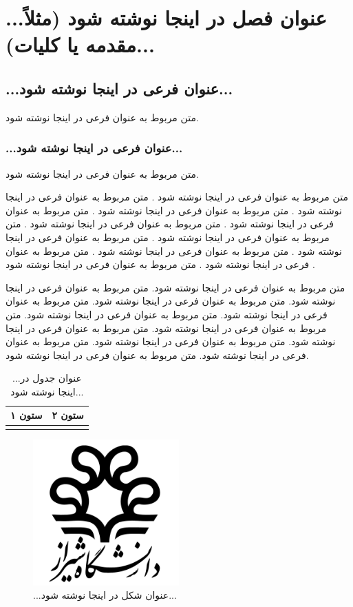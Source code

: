 \chapter{...عنوان فصل در اینجا نوشته شود (مثلاً مقدمه یا کلیات)...}

\section{...عنوان فرعی در اینجا نوشته شود...}
متن مربوط به عنوان فرعی در اینجا نوشته شود.

\subsection{...عنوان فرعی در اینجا نوشته شود...}
متن مربوط به عنوان فرعی در اینجا نوشته شود.

\newpage
متن مربوط به عنوان فرعی در اینجا نوشته شود \cite{sharif_1390}.
متن مربوط به عنوان فرعی در اینجا نوشته شود \cite{ghalamfarsa_1394}.
متن مربوط به عنوان فرعی در اینجا نوشته شود \cite{howitt_2008}.
متن مربوط به عنوان فرعی در اینجا نوشته شود \cite{ranzijn_2009}.
متن مربوط به عنوان فرعی در اینجا نوشته شود \cite{datnoff_2001}.
متن مربوط به عنوان فرعی در اینجا نوشته شود \cite{sas}.
متن مربوط به عنوان فرعی در اینجا نوشته شود \cite{rahimian_1392}.
متن مربوط به عنوان فرعی در اینجا نوشته شود \cite{alishahi_1393}.
متن مربوط به عنوان فرعی در اینجا نوشته شود \cite{andjic_2007,sohrabi_2011}.
متن مربوط به عنوان فرعی در اینجا نوشته شود \cite{game_2001,habibi_1394,ignatov_2013,bekker_2007,aps,wikipedia}.

\newpage
متن مربوط به عنوان فرعی در اینجا نوشته شود.
متن مربوط به عنوان فرعی در اینجا نوشته شود.
متن مربوط به عنوان فرعی در اینجا نوشته شود.
متن مربوط به عنوان فرعی در اینجا نوشته شود.
متن مربوط به عنوان فرعی در اینجا نوشته شود.
متن مربوط به عنوان فرعی در اینجا نوشته شود.
متن مربوط به عنوان فرعی در اینجا نوشته شود.
متن مربوط به عنوان فرعی در اینجا نوشته شود.
متن مربوط به عنوان فرعی در اینجا نوشته شود.
متن مربوط به عنوان فرعی در اینجا نوشته شود.

\newpage
\begin{table}
    \centering
    \caption{...عنوان جدول در اینجا نوشته شود...}
    \begin{tabular}{|c|c|}
        \hline
        ستون ۱ & ستون ۲ \\
        \hline
               &        \\
        \hline
    \end{tabular}
\end{table}

\begin{figure}
    \centering
    \includegraphics[width=0.5\textwidth]{assets/shiraz_university_logo}
    \caption{...عنوان شکل در اینجا نوشته شود...}
\end{figure}
